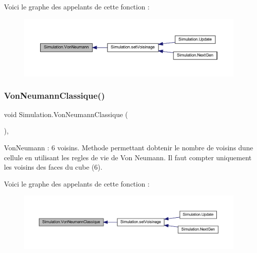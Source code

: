 Voici le graphe des appelants de cette fonction \+:
\nopagebreak
\begin{figure}[H]
\begin{center}
\leavevmode
\includegraphics[width=350pt]{class_simulation_af23614524fe3045d198d953f09264f79_icgraph}
\end{center}
\end{figure}
\mbox{\label{class_simulation_a8b95cd2e9f897c0dab40119ac1c54f39}} 
\subsubsection{\texorpdfstring{Von\+Neumann\+Classique()}{VonNeumannClassique()}}
{\footnotesize\ttfamily void Simulation.\+Von\+Neumann\+Classique (\begin{DoxyParamCaption}{ }\end{DoxyParamCaption})\hspace{0.3cm}{\ttfamily [inline]}, {\ttfamily [private]}}



Von\+Neumann \+: 6 voisins. Methode permettant d\textquotesingle{}obtenir le nombre de voisins d\textquotesingle{}une cellule en utilisant les regles de vie de Von Neumann. Il faut compter uniquement les voisins des faces du cube (6). 

Voici le graphe des appelants de cette fonction \+:
\nopagebreak
\begin{figure}[H]
\begin{center}
\leavevmode
\includegraphics[width=350pt]{class_simulation_a8b95cd2e9f897c0dab40119ac1c54f39_icgraph}
\end{center}
\end{figure}


